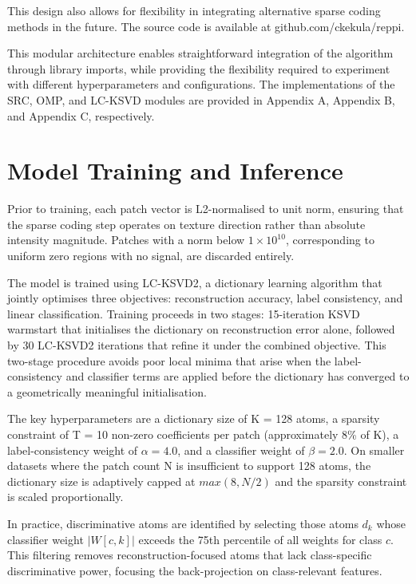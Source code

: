 This design also allows for flexibility in integrating alternative sparse coding methods in the future.
The source code is available at github.com/ckekula/reppi.

This modular architecture enables straightforward integration of the algorithm through library imports, while providing
the flexibility required to experiment with different hyperparameters and configurations. The implementations of the SRC,
OMP, and LC-KSVD modules are provided in Appendix A, Appendix B, and Appendix C, respectively.

\section{Model Training and Inference}
Prior to training, each patch vector is L2-normalised to unit norm, ensuring that the sparse coding step operates on
texture direction rather than absolute intensity magnitude. Patches with a norm below $ 1 \times 10^{10} $,
corresponding to uniform zero regions with no signal, are discarded entirely.

The model is trained using LC-KSVD2, a dictionary learning algorithm that jointly optimises three objectives:
reconstruction accuracy, label consistency, and linear classification. Training proceeds in two stages:
15-iteration KSVD warmstart that initialises the dictionary on reconstruction error alone, followed by 30 LC-KSVD2 iterations
that refine it under the combined objective. This two-stage procedure avoids poor local minima that arise when the
label-consistency and classifier terms are applied before the dictionary has converged to a geometrically meaningful initialisation.

The key hyperparameters are a dictionary size of K = 128 atoms, a sparsity constraint of T = 10 non-zero coefficients per patch
(approximately 8\% of K), a label-consistency weight of $ \alpha = 4.0 $, and a classifier weight of $ \beta = 2.0 $.
On smaller datasets where the patch count N is insufficient to support 128 atoms, the dictionary size is adaptively capped at
$ max(8, N/2) $ and the sparsity constraint is scaled proportionally.

In practice, discriminative atoms are identified by selecting those atoms $d_k$ whose classifier weight $|W[c, k]|$ 
exceeds the 75th percentile of all weights for class $c$. This filtering removes reconstruction-focused atoms that 
lack class-specific discriminative power, focusing the back-projection on class-relevant features.


